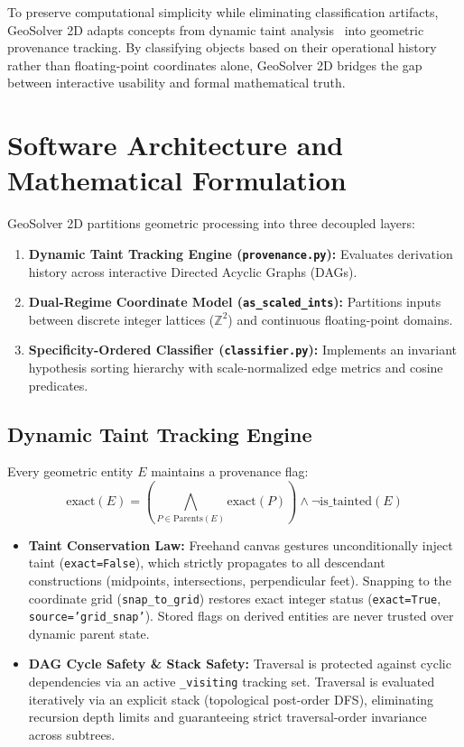 \documentclass[preprint,12pt]{elsarticle}
\begin{document}
To preserve computational simplicity while eliminating classification artifacts, GeoSolver 2D adapts concepts from dynamic taint analysis~\cite{schwartz2010} into geometric provenance tracking. By classifying objects based on their operational history rather than floating-point coordinates alone, GeoSolver 2D bridges the gap between interactive usability and formal mathematical truth.

\section{Software Architecture and Mathematical Formulation}

GeoSolver 2D partitions geometric processing into three decoupled layers:
\begin{enumerate}
    \item \textbf{Dynamic Taint Tracking Engine (\texttt{provenance.py}):} Evaluates derivation history across interactive Directed Acyclic Graphs (DAGs).
    \item \textbf{Dual-Regime Coordinate Model (\texttt{as\_scaled\_ints}):} Partitions inputs between discrete integer lattices ($\mathbb{Z}^2$) and continuous floating-point domains.
    \item \textbf{Specificity-Ordered Classifier (\texttt{classifier.py}):} Implements an invariant hypothesis sorting hierarchy with scale-normalized edge metrics and cosine predicates.
\end{enumerate}

\subsection{Dynamic Taint Tracking Engine}
Every geometric entity $E$ maintains a provenance flag:
\begin{equation}
\text{exact}(E) = \left(\bigwedge_{P \in \text{Parents}(E)} \text{exact}(P)\right) \land \neg \text{is\_tainted}(E)
\end{equation}
\begin{itemize}
    \item \textbf{Taint Conservation Law:} Freehand canvas gestures unconditionally inject taint (\texttt{exact=False}), which strictly propagates to all descendant constructions (midpoints, intersections, perpendicular feet). Snapping to the coordinate grid (\texttt{snap\_to\_grid}) restores exact integer status (\texttt{exact=True}, \texttt{source='grid\_snap'}). Stored flags on derived entities are never trusted over dynamic parent state.
    \item \textbf{DAG Cycle Safety \& Stack Safety:} Traversal is protected against cyclic dependencies via an active \texttt{\_visiting} tracking set. Traversal is evaluated iteratively via an explicit stack (topological post-order DFS), eliminating recursion depth limits and guaranteeing strict traversal-order invariance across subtrees.
\end{itemize}
\end{document}
